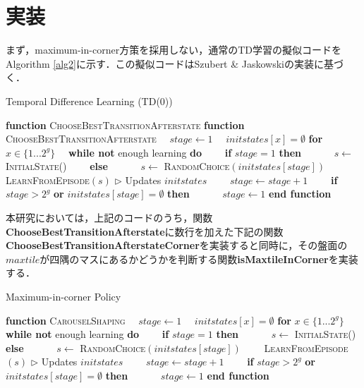 \documentclass{suribt}
\begin{document}
\section{実装}
まず，maximum-in-corner方策を採用しない，通常のTD学習の擬似コードをAlgorithm \ref{alg2}に示す．この擬似コードはSzubert \& Jaskowskiの実装に基づく．

\begin{algorithm}
\caption{Temporal Difference Learning (TD(0))}
\label{alg2}
\begin{algorithmic}[1]
\STATE \textbf{function} \textsc{ChooseBestTransitionAfterstate}
\STATE
\STATE \textbf{function} \textsc{ChooseBestTransitionAfterstate}
\STATE 　$stage \leftarrow 1$
\STATE 　$initstates[x] = \emptyset$ \textbf{for} $x \in \{1...2^g\}$
\STATE 　\textbf{while not} enough learning \textbf{do}
\STATE 　　\textbf{if} $stage = 1$ \textbf{then}
\STATE 　　　$s \leftarrow$ \textsc{InitialState()}
\STATE 　　\textbf{else}
\STATE 　　　$s \leftarrow$ \textsc{RandomChoice}$(initstates[stage])$
\STATE 　　\textsc{LearnFromEpisode}$(s)$ $\triangleright$ Updates $initstates$
\STATE 　　$stage \leftarrow stage + 1$
\STATE 　　\textbf{if} $stage > 2^g$ \textbf{or} $initstates[stage] = \emptyset$ \textbf{then}
\STATE 　　　$stage \leftarrow 1$
\STATE \textbf{end function}
\end{algorithmic}
\end{algorithm}

本研究においては，上記のコードのうち，関数\textbf{ChooseBestTransitionAfterstate}に数行を加えた下記の関数\textbf{ChooseBestTransitionAfterstateCorner}を実装すると同時に，その盤面の$maxtile$が四隅のマスにあるかどうかを判断する関数\textbf{isMaxtileInCorner}を実装する．

\begin{algorithm}
\caption{Maximum-in-corner Policy}
\label{alg3}
\begin{algorithmic}[1]
\STATE \textbf{function} \textsc{CarouselShaping}
\STATE 　$stage \leftarrow 1$
\STATE 　$initstates[x] = \emptyset$ \textbf{for} $x \in \{1...2^g\}$
\STATE 　\textbf{while not} enough learning \textbf{do}
\STATE 　　\textbf{if} $stage = 1$ \textbf{then}
\STATE 　　　$s \leftarrow$ \textsc{InitialState()}
\STATE 　　\textbf{else}
\STATE 　　　$s \leftarrow$ \textsc{RandomChoice}$(initstates[stage])$
\STATE 　　\textsc{LearnFromEpisode}$(s)$ $\triangleright$ Updates $initstates$
\STATE 　　$stage \leftarrow stage + 1$
\STATE 　　\textbf{if} $stage > 2^g$ \textbf{or} $initstates[stage] = \emptyset$ \textbf{then}
\STATE 　　　$stage \leftarrow 1$
\STATE \textbf{end function}
\end{algorithmic}
\end{algorithm}
\end{document}
